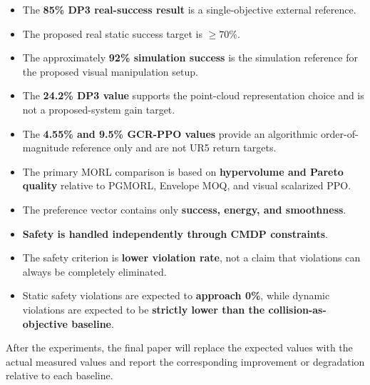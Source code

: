\documentclass[journal]{IEEEtran}
\begin{document}
\begin{itemize}
    \item The \textbf{85\% DP3 real-success result} is a
    single-objective external reference.

    \item The proposed real static success target is
    \textbf{$\geq70\%$}.

    \item The approximately \textbf{92\% simulation success} is the
    simulation reference for the proposed visual manipulation setup.

    \item The \textbf{24.2\% DP3 value} supports the point-cloud
    representation choice and is not a proposed-system gain target.

    \item The \textbf{4.55\% and 9.5\% GCR-PPO values} provide an
    algorithmic order-of-magnitude reference only and are not UR5
    return targets.

    \item The primary MORL comparison is based on
    \textbf{hypervolume and Pareto quality} relative to PGMORL,
    Envelope MOQ, and visual scalarized PPO.

    \item The preference vector contains only
    \textbf{success, energy, and smoothness}.

    \item \textbf{Safety is handled independently through CMDP
    constraints}.

    \item The safety criterion is \textbf{lower violation rate},
    not a claim that violations can always be completely eliminated.

    \item Static safety violations are expected to
    \textbf{approach 0\%}, while dynamic violations are expected to
    be \textbf{strictly lower than the collision-as-objective
    baseline}.
\end{itemize}

After the experiments, the final paper will replace the expected
values with the actual measured values and report the corresponding
improvement or degradation relative to each baseline.
\end{document}

